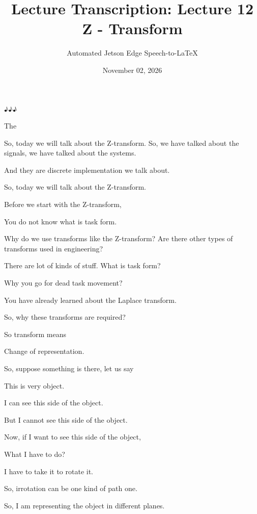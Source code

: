 \documentclass{article}
\title{Lecture Transcription: Lecture 12 Z - Transform}
\author{Automated Jetson Edge Speech-to-LaTeX}
\date{November 02, 2026}
\begin{document}
\maketitle

♪♪♪

The



So, today we will talk about the Z-transform. So, we have talked about the signals, we have talked about the systems.

And they are discrete implementation we talk about.

So, today we will talk about the Z-transform.

Before we start with the Z-transform,

You do not know what is task form.

Why do we use transforms like the Z-transform? Are there other types of transforms used in engineering?

There are lot of kinds of stuff. What is task form?

Why you go for dead task movement?

You have already learned about the Laplace transform.

So, why these transforms are required?



So transform means

Change of representation.

So, suppose something is there, let us say

This is very object.

I can see this side of the object.

But I cannot see this side of the object.

Now, if I want to see this side of the object,

What I have to do?

I have to take it to rotate it.

So, irrotation can be one kind of path one.

So, I am representing the object in different planes.
\end{document}
